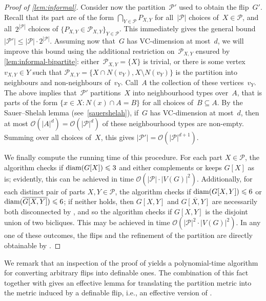\documentclass[a4paper,UKenglish,cleveref, autoref, thm-restate]{lipics-v2021}
\newcommand{\Oof}{{\cal O}}
\renewcommand{\cal}{\mathcal}
\newcommand{\diam}{\textnormal{diam}}
\newcommand{\PP}{\mathcal{P}}
\renewcommand{\le}{\leqslant}
\renewcommand{\leq}{\le}
\begin{document}
\begin{proof}[Proof of \cref{lem:informal}]
  Consider now the partition~$\PP'$ used to obtain the flip~$G'$.
  Recall that its part are of the form $\bigcap_{Y \in \PP} P_{X,Y}$
  for all~$|\PP|$ choices of~$X \in \PP$, and all~$2^{|\PP|}$ choices of $\{P_{X,Y} \in \PP_{X,Y}\}_{Y \in \PP}$.
  This immediately gives the general bound $|\PP'| \le |\PP| \cdot 2^{|\PP|}$.
  Assuming now that~$G$ has VC-dimension at most~$d$,
  we will improve this bound using the additional restriction on~$\PP_{X,Y}$ ensured by \cref{lem:informal-bipartite}:
  either~$\PP_{X,Y} = \{X\}$ is trivial, or there is some vertex~$v_{X,Y} \in Y$ such that $\PP_{X,Y} = \{X \cap N(v_Y), X \setminus N(v_Y)\}$ is the partition into neighbours and non-neighbours of~$v_Y$.
  Call~$A$ the collection of these vertices~$v_Y$.
  The above implies that~$\PP'$ partitions~$X$ into neighbourhood types over~$A$,
  that is parts of the form $\{x \in X : N(x) \cap A = B\}$ for all choices of~$B \subseteq A$.
  By the Sauer--Shelah lemma (see~\cref{sauershelah}), if~$G$ has VC-dimension at most~$d$,
  then at most $\Oof(|A|^d) = \Oof(|\PP|^d)$ of these neighbourhood types are non-empty.
  Summing over all choices of~$X$, this gives $|\PP'| = \Oof(|\PP|^{d+1})$.
  
  We finally compute the running time of this procedure. For each part $X \in \PP$, the algorithm checks if $\diam(G[X])\leq 3$ and either complements or keeps $G[X]$ as is; evidently, this can be achieved in time $\cal{O}(|\PP|\cdot |V(G)|^2)$. Additionally, for each distinct pair of parts $X,Y \in \PP$, the algorithm checks if $\diam(G[X,Y])\leq 6$ or $\diam(\overline{G[X,Y]})\leq 6$; if neither holds, then $G[X,Y]$ and $\overline{G[X,Y]}$ are necessarily both disconnected by , and so the algorithm checks if $G[X,Y]$ is the disjoint union of two bicliques. This may be achieved in time $\cal{O}(|\PP|^2\cdot |V(G)|^2)$. In any one of these outcomes, the flips and the refinement of the partition are directly obtainable by .
\end{proof}

We remark that an inspection of the proof of  yields a polynomial-time algorithm for converting arbitrary flips into definable ones. The combination of this fact together with  gives an effective lemma for translating the partition metric into the metric induced by a definable flip, i.e., an effective version of . 
\end{document}
